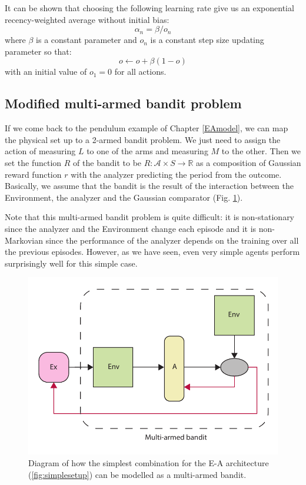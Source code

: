 \documentclass[11pt,a4paper,twoside]{report}
\newcommand{\+}{\textnormal{+} }
\theoremstyle{definition}
\numberwithin{equation}{chapter}
\begin{document}
  It can be shown that choosing the following learning rate give us an
  exponential recency-weighted average without initial bias:
  \begin{equation}
    \alpha_n = \beta/o_n
  \end{equation}
  where $\beta$ is a constant parameter and $o_n$ is a constant step size
  updating parameter so that:
  \begin{equation}
    o \gets o + \beta(1-o) 
  \end{equation}
  with an initial value of $o_1=0$ for all actions.

\subsection{Modified multi-armed bandit problem}

If we come back to the pendulum example of Chapter \ref{EAmodel}, we can map the
physical set up to a 2-armed bandit problem. We just need to assign the action
of  measuring $L$ to one of the arms and measuring $M$ to the other. Then we set
the function $R$ of the bandit to be $R:\mathcal{A}\times S\rightarrow
\mathbb{R}$ as a composition of Gaussian reward function $r$ with the analyzer
predicting the period from the outcome. Basically, we assume that the bandit is
the result of the interaction between the Environment, the analyzer and the
Gaussian comparator (Fig. \ref{fig:Bandit-EA}). \par Note that this multi-armed
bandit problem is quite difficult: it is non-stationary since the analyzer and
the Environment change each episode and it is non-Markovian since the
performance of the analyzer depends on the training over all the previous
episodes. However, as we have seen, even very simple agents perform surprisingly
well for this simple case.


\begin{figure}
  \centering 
\includegraphics[scale=0.75]{figures/Bandit-EA.pdf}
\caption{Diagram of how the simplest combination for the E-A architecture
(\ref{fig:simplesetup}) can be modelled as a multi-armed bandit.}
\label{fig:Bandit-EA}
\end{figure}
\end{document}
